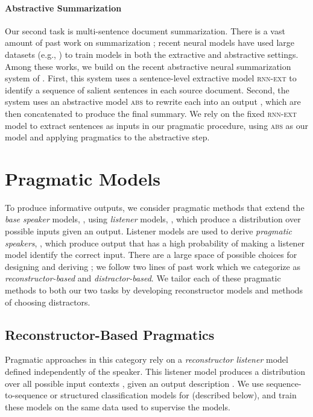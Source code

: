 \documentclass[11pt,a4paper]{article}
\newcommand{\basespk}[0]{\xspace}
\newcommand{\eg}{e.g., }
\begin{document}
\paragraph{Abstractive Summarization}
Our second task is multi-sentence document summarization. There is a vast amount of past work on summarization \cite{nenkova2011automatic}; recent neural models have used large datasets (\eg \citet{hermann2015teaching}) to train models in both the extractive \cite{cheng2016summarization,nallapati2017summarunner} and abstractive  \cite{rush2015abstractive,see2017summarization} settings.
Among these works, we build on the recent abstractive neural summarization system of . First, this system uses a sentence-level extractive model \textsc{rnn-ext} to identify a sequence of salient sentences  in each source document. Second, the system uses an abstractive model \textsc{abs} to rewrite each  into an output , which are then concatenated to produce the final summary. We rely on the fixed \textsc{rnn-ext} model to extract sentences as inputs in our pragmatic procedure, using \textsc{abs} as our \basespk model and applying pragmatics to the  abstractive step.



 \section{Pragmatic Models}
\label{sec:pragmatic_models}

To produce informative outputs, we consider pragmatic methods that extend the \emph{base speaker} models, \basespk, using \emph{listener} models, , which produce a distribution  over possible inputs given an output. Listener models are used to derive \emph{pragmatic speakers}, , which produce output that has a high probability of making a listener model  identify the correct input. 
There are a large space of possible choices for designing  and deriving ; we follow two lines of past work which we categorize as \emph{reconstructor-based} and \emph{distractor-based}.
We tailor each of these pragmatic methods to both our two tasks by developing reconstructor models and methods of choosing distractors.


\subsection{Reconstructor-Based Pragmatics}
\label{sec:pragr}
Pragmatic approaches in this category \cite{duvsek2016sequence,fried2017unified} rely on a \emph{reconstructor listener} model  defined independently of the speaker. This listener model produces a distribution  over 
all possible input contexts , given an output description . We use sequence-to-sequence or structured classification models for  (described below), and train these models on the same data used to supervise the  models. 
\end{document}
